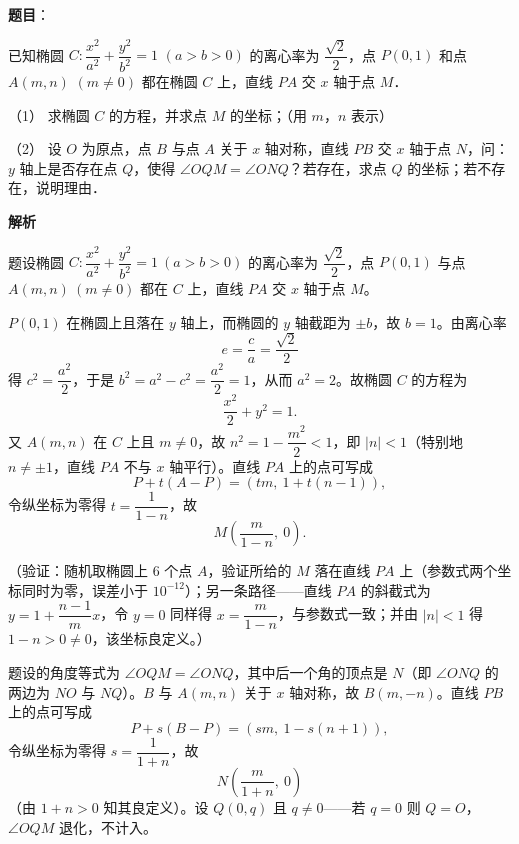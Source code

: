 \begin{answer}

\textbf{题目}：

已知椭圆 \(C:\dfrac{x^{2}}{a^{2}}+\dfrac{y^{2}}{b^{2}}=1\) \((a>b>0)\) 的离心率为 \(\dfrac{\sqrt{2}}{2}\)，点 \(P(0,1)\) 和点 \(A(m,n)\) \((m\neq 0)\) 都在椭圆 \(C\) 上，直线 \(PA\) 交 \(x\) 轴于点 \(M\)．

（1） 求椭圆 \(C\) 的方程，并求点 \(M\) 的坐标；（用 \(m\)，\(n\) 表示）

（2） 设 \(O\) 为原点，点 \(B\) 与点 \(A\) 关于 \(x\) 轴对称，直线 \(PB\) 交 \(x\) 轴于点 \(N\)，问：\(y\) 轴上是否存在点 \(Q\)，使得 \(\angle OQM=\angle ONQ\)？若存在，求点 \(Q\) 的坐标；若不存在，说明理由．

\textbf{解析}

题设椭圆 \(C:\dfrac{x^{2}}{a^{2}}+\dfrac{y^{2}}{b^{2}}=1\ (a>b>0)\) 的离心率为 \(\dfrac{\sqrt{2}}{2}\)，点 \(P(0,1)\) 与点 \(A(m,n)\ (m\neq0)\) 都在 \(C\) 上，直线 \(PA\) 交 \(x\) 轴于点 \(M\)。


\(P(0,1)\) 在椭圆上且落在 \(y\) 轴上，而椭圆的 \(y\) 轴截距为 \(\pm b\)，故 \(b=1\)。由离心率
\nopagebreak[4]
\[
e=\frac{c}{a}=\frac{\sqrt{2}}{2}
\]
得 \(c^{2}=\dfrac{a^{2}}{2}\)，于是 \(b^{2}=a^{2}-c^{2}=\dfrac{a^{2}}{2}=1\)，从而 \(a^{2}=2\)。故椭圆 \(C\) 的方程为
\nopagebreak[4]
\[
\frac{x^{2}}{2}+y^{2}=1 .
\]
又 \(A(m,n)\) 在 \(C\) 上且 \(m\neq0\)，故 \(n^{2}=1-\dfrac{m^{2}}{2}<1\)，即 \(|n|<1\)（特别地 \(n\neq\pm1\)，直线 \(PA\) 不与 \(x\) 轴平行）。直线 \(PA\) 上的点可写成
\nopagebreak[4]
\[
P+t(A-P)=(tm,\ 1+t(n-1)),
\]
令纵坐标为零得 \(t=\dfrac{1}{1-n}\)，故
\nopagebreak[4]
\[
M\left(\frac{m}{1-n},\ 0\right).
\]

（验证：随机取椭圆上 \(6\) 个点 \(A\)，验证所给的 \(M\) 落在直线 \(PA\) 上（参数式两个坐标同时为零，误差小于 \(10^{-12}\)）；另一条路径——直线 \(PA\) 的斜截式为 \(y=1+\dfrac{n-1}{m}x\)，令 \(y=0\) 同样得 \(x=\dfrac{m}{1-n}\)，与参数式一致；并由 \(|n|<1\) 得 \(1-n>0\neq0\)，该坐标良定义。）


题设的角度等式为 \(\angle OQM=\angle ONQ\)，其中后一个角的顶点是 \(N\)（即 \(\angle ONQ\) 的两边为 \(NO\) 与 \(NQ\)）。\(B\) 与 \(A(m,n)\) 关于 \(x\) 轴对称，故 \(B(m,-n)\)。直线 \(PB\) 上的点可写成
\nopagebreak[4]
\[
P+s(B-P)=(sm,\ 1-s(n+1)),
\]
令纵坐标为零得 \(s=\dfrac{1}{1+n}\)，故
\nopagebreak[4]
\[
N\left(\frac{m}{1+n},\ 0\right)
\]
（由 \(1+n>0\) 知其良定义）。设 \(Q(0,q)\) 且 \(q\neq0\)——若 \(q=0\) 则 \(Q=O\)，\(\angle OQM\) 退化，不计入。


\end{answer}
